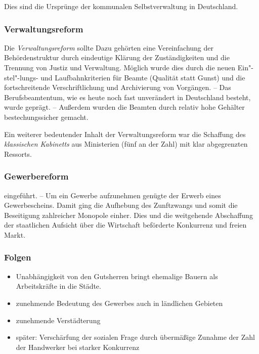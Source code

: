 Dies sind die Ursprünge der kommunalen Selbstverwaltung in Deutschland.

\subsubsection{Verwaltungsreform}

Die \emph{Verwaltungsreform} sollte
 Dazu gehörten eine
Vereinfachung der Behördenstruktur durch eindeutige Klärung der
Zuständigkeiten und die Trennung von Justiz und Verwaltung. Möglich
wurde dies durch die neuen Ein"-stel"-lungs- und Laufbahnkriterien für
Beamte (Qualität statt Gunst) und die fortschreitende
Verschriftlichung und Archivierung von Vorgängen. -- Das
Berufsbeamtentum, wie es heute noch fast unverändert in Deutschland
besteht, wurde geprägt. -- Außerdem wurden die Beamten durch relativ
hohe Gehälter bestechungssicher gemacht.

Ein weiterer bedeutender Inhalt der Verwaltungsreform war die
Schaffung des \emph{klassischen Kabinetts} aus Ministerien (fünf an
der Zahl) mit klar abgegrenzten Ressorts.

\subsubsection{Gewerbereform}

 eingeführt. -- Um ein Gewerbe
aufzunehmen genügte der Erwerb eines Gewerbescheins.
 Damit ging die Aufhebung
des Zunftzwangs und somit die Beseitigung zahlreicher Monopole einher.
Dies und die weitgehende Abschaffung der staatlichen Aufsicht über die
Wirtschaft beförderte Konkurrenz und freien Markt.

\subsubsection{Folgen}

\begin{itemize}
\item Unabhängigkeit von den Gutsherren bringt ehemalige Bauern als
Arbeitskräfte in die Städte.
\item zunehmende Bedeutung des Gewerbes auch in ländlichen Gebieten
\item zunehmende Verstädterung
\item später: Verschärfung der sozialen Frage durch übermäßige Zunahme
der Zahl der Handwerker bei starker Konkurrenz
\end{itemize}


